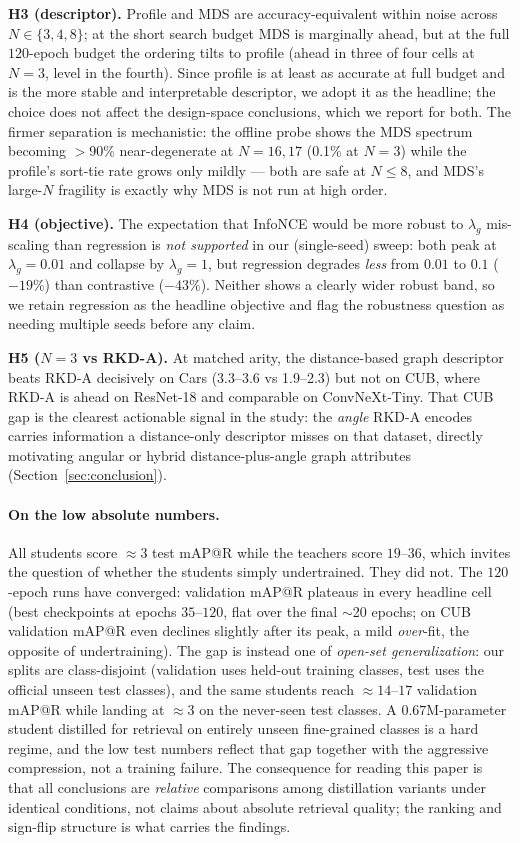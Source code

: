 \documentclass[11pt,letterpaper]{article}
\begin{document}
\textbf{H3 (descriptor).} Profile and MDS are accuracy-equivalent within noise across
$N \in \{3,4,8\}$; at the short search budget MDS is marginally ahead, but at the full
$120$-epoch budget the ordering tilts to profile (ahead in three of four cells at $N{=}3$,
level in the fourth). Since profile is at least as accurate at full budget and is the more
stable and interpretable descriptor, we adopt it as the headline; the choice does not
affect the design-space conclusions, which we report for both. The firmer separation is
mechanistic: the offline probe shows the MDS spectrum becoming $>$90\% near-degenerate at
$N{=}16,17$ (0.1\% at $N{=}3$) while the profile's sort-tie rate grows only mildly ---
both are safe at $N \leq 8$, and MDS's large-$N$ fragility is exactly why MDS is not run
at high order.

\textbf{H4 (objective).} The expectation that InfoNCE would be more robust to $\lambda_g$
mis-scaling than regression is \emph{not supported} in our (single-seed) sweep: both peak
at $\lambda_g{=}0.01$ and collapse by $\lambda_g{=}1$, but regression degrades \emph{less}
from $0.01$ to $0.1$ ($-19\%$) than contrastive ($-43\%$). Neither shows a clearly wider
robust band, so we retain regression as the headline objective and flag the robustness
question as needing multiple seeds before any claim.

\textbf{H5 ($N{=}3$ vs RKD-A).} At matched arity, the distance-based graph descriptor
beats RKD-A decisively on Cars (3.3--3.6 vs 1.9--2.3) but not on CUB, where RKD-A is ahead
on ResNet-18 and comparable on ConvNeXt-Tiny. That CUB gap is the clearest actionable
signal in the study: the \emph{angle} RKD-A encodes carries information a distance-only
descriptor misses on that dataset, directly motivating angular or hybrid
distance-plus-angle graph attributes (Section~\ref{sec:conclusion}).

\paragraph{On the low absolute numbers.} All students score $\approx 3$ test mAP@R while
the teachers score $19$--$36$, which invites the question of whether the students simply
undertrained. They did not. The $120$-epoch runs have converged: validation mAP@R plateaus
in every headline cell (best checkpoints at epochs $35$--$120$, flat over the final
$\sim$20 epochs; on CUB validation mAP@R even declines slightly after its peak, a mild
\emph{over}-fit, the opposite of undertraining). The gap is instead one of
\emph{open-set generalization}: our splits are class-disjoint (validation uses held-out
training classes, test uses the official unseen test classes), and the same students reach
$\approx 14$--$17$ validation mAP@R while landing at $\approx 3$ on the never-seen test
classes. A $0.67$M-parameter student distilled for retrieval on entirely unseen
fine-grained classes is a hard regime, and the low test numbers reflect that gap together
with the aggressive compression, not a training failure. The consequence for reading this
paper is that all conclusions are \emph{relative} comparisons among distillation variants
under identical conditions, not claims about absolute retrieval quality; the ranking and
sign-flip structure is what carries the findings.
\end{document}
